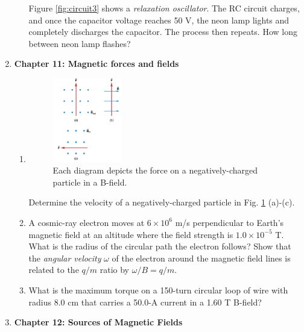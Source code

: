 \documentclass[10pt]{article}
\begin{document}
\begin{enumerate}
\begin{enumerate}
\begin{figure}[ht]
\end{figure}
Figure \ref{fig:circuit3} shows a \textit{relaxation oscillator}.  The RC circuit charges, and once the capacitor voltage reaches 50 V, the neon lamp lights and completely discharges the capacitor.  The process then repeats.  How long between neon lamp flashes? \\ \vspace{2cm}
\end{enumerate}
\item \textbf{Chapter 11: Magnetic forces and fields}
\begin{enumerate}
\item 
\begin{figure}[ht]
\centering
\includegraphics[width=0.3\textwidth]{lorentz1.png}
\caption{\label{fig:lorentz1} Each diagram depicts the force on a negatively-charged particle in a B-field.}
\end{figure}
Determine the velocity of a negatively-charged particle in Fig. \ref{fig:lorentz1} (a)-(c). \\ \vspace{1cm}
\item A cosmic-ray electron moves at $6 \times 10^6$ m/s perpendicular to Earth’s magnetic field at an altitude where the field strength is $1.0 \times 10^{-5}$ T. What is the radius of the circular path the electron follows?  Show that the \textit{angular velocity} $\omega$ of the electron around the magnetic field lines is related to the $q/m$ ratio by $\omega/B = q/m$. \\ \vspace{1.5 cm}
\item What is the maximum torque on a 150-turn circular loop of wire with radius 8.0 cm that carries a 50.0-A current in a 1.60 T B-field? \\ \vspace{2 cm}
\end{enumerate}
\item \textbf{Chapter 12: Sources of Magnetic Fields}
\begin{enumerate}

\end{enumerate}
\end{enumerate}
\end{document}
